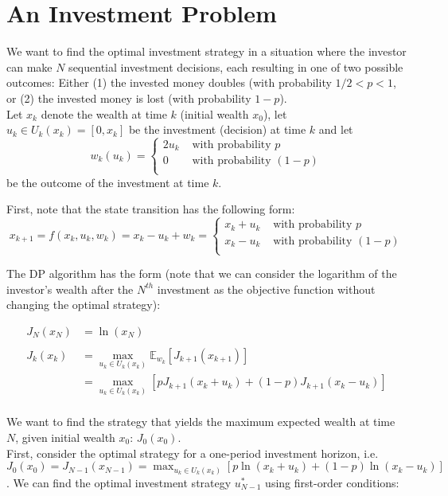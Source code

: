 \documentclass[11pt, oneside]{article}   	%
\begin{document}
\section{An Investment Problem}
We want to find the optimal investment strategy in a situation where the investor can make $N$ sequential investment decisions, each resulting in one of two possible outcomes: Either (1) the invested money doubles (with probability $1/2 < p < 1$, or (2) the invested money is lost (with probability $1-p$). \\

Let $x_k$ denote the wealth at time $k$ (initial wealth $x_0$), let $u_k \in U_k(x_k) = [0, x_k]$ be the investment (decision) at time $k$ and let
$$
w_k(u_k) =
\begin{cases}
2 u_k & \text{ with probability } p\\
0 & \text{ with probability } (1-p)\\
\end{cases}
$$
be the outcome of the investment at time $k$.

First, note that the state transition has the following form:
$$
x_{k+1} = f(x_k,u_k,w_k) = x_k - u_k + w_k =
\begin{cases}
x_k + u_k & \text{ with probability } p\\
x_k - u_k & \text{ with probability } (1-p)\\
\end{cases}
$$

The DP algorithm has the form (note that we can consider the logarithm of the investor's wealth after the $N^{th}$ investment as the objective function without changing the optimal strategy):

\begin{align*}
J_N(x_N) &= \ln(x_N)\\
\\
J_k(x_k) &=  \max_{u_k \in U_k(x_k)} \mathbb{E}_{w_k} \left[ J_{k+1} (x_{k+1}) \right]\\
&=  \max_{u_k \in U_k(x_k)} \left[ p J_{k+1} (x_k + u_k) + (1-p) J_{k+1} (x_k - u_k)\right]\\
\end{align*}

We want to find the strategy that yields the maximum expected wealth at time $N$, given initial wealth $x_0$: $J_0(x_0)$. \\ First, consider the optimal strategy for a one-period investment horizon, i.e. $J_0(x_0) = J_{N-1}(x_{N-1}) = \max_{u_k \in U_k(x_k)} \left[ p \ln (x_k + u_k) + (1-p) \ln (x_k - u_k)\right]$. We can find the optimal investment strategy $u_{N-1}^*$ using first-order conditions:
\end{document}
